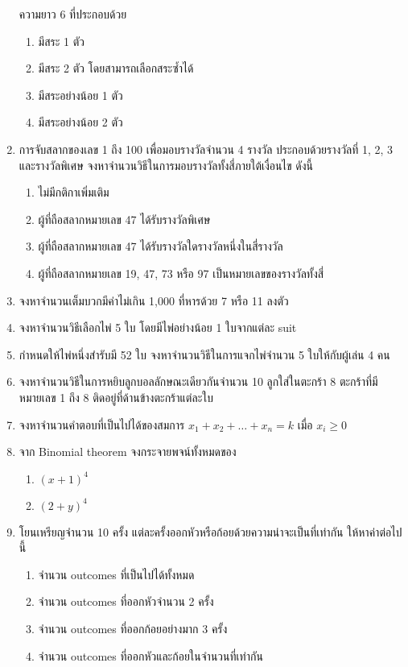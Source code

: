 \documentclass{article}
\begin{document}
\begin{enumerate}
	ความยาว 6 ที่ประกอบด้วย
	\begin{enumerate}
		\item มีสระ 1 ตัว
		\item มีสระ 2 ตัว โดยสามารถเลือกสระซ้ำได้
		\item มีสระอย่างน้อย 1 ตัว
		\item มีสระอย่างน้อย 2 ตัว
	\end{enumerate}
	\item การจับสลากของเลข 1 ถึง 100 เพื่อมอบรางวัลจำนวน 4 รางวัล ประกอบด้วยรางวัลที่ 1, 2, 3 และรางวัลพิเศษ\newline
	จงหาจำนวนวิธีในการมอบรางวัลทั้งสี่ภายใต้เงื่อนไข ดังนี้
	\begin{enumerate}
		\item ไม่มีกติกาเพิ่มเติม
		\item ผู้ที่ถือสลากหมายเลข 47 ได้รับรางวัลพิเศษ
		\item ผู้ที่ถือสลากหมายเลข 47 ได้รับรางวัลใดรางวัลหนึ่งในสี่รางวัล
		\item ผู้ที่ถือสลากหมายเลข 19, 47, 73 หรือ 97 เป็นหมายเลขของรางวัลทั้งสี่
	\end{enumerate}
	\item จงหาจำนวนเต็มบวกมีค่าไม่เกิน 1,000 ที่หารด้วย 7 หรือ 11 ลงตัว
	\item จงหาจำนวนวิธีเลือกไพ่ 5 ใบ โดยมีไพ่อย่างน้อย 1 ใบจากแต่ละ suit
	\item กำหนดให้ไพ่หนึ่งสำรับมี 52 ใบ จงหาจำนวนวิธีในการแจกไพ่จำนวน 5 ใบให้กับผู้เล่น 4 คน
	\item จงหาจำนวนวิธีในการหยิบลูกบอลลักษณะเดียวกันจำนวน 10 ลูกใส่ในตะกร้า 8 ตะกร้าที่มีหมายเลข 1 ถึง 8\newline
	ติดอยู่ที่ด้านข้างตะกร้าแต่ละใบ
	\item จงหาจำนวนคำตอบที่เป็นไปได้ของสมการ $x_1 + x_2 + \dots + x_n = k$ เมื่อ $x_i \geq 0$

	\pagebreak

	\item จาก Binomial theorem จงกระจายพจน์ทั้งหมดของ
	\begin{enumerate}
		\item ${(x + 1)}^4$
		\item ${(2 + y)}^4$
	\end{enumerate}
	\item โยนเหรียญจำนวน 10 ครั้ง แต่ละครั้งออกหัวหรือก้อยด้วยความน่าจะเป็นที่เท่ากัน ให้หาค่าต่อไปนี้
	\begin{enumerate}
		\item จำนวน outcomes ที่เป็นไปได้ทั้งหมด
		\item จำนวน outcomes ที่ออกหัวจำนวน 2 ครั้ง
		\item จำนวน outcomes ที่ออกก้อยอย่างมาก 3 ครั้ง
		\item จำนวน outcomes ที่ออกหัวและก้อยในจำนวนที่เท่ากัน
	\end{enumerate}
\end{enumerate}
\end{document}
